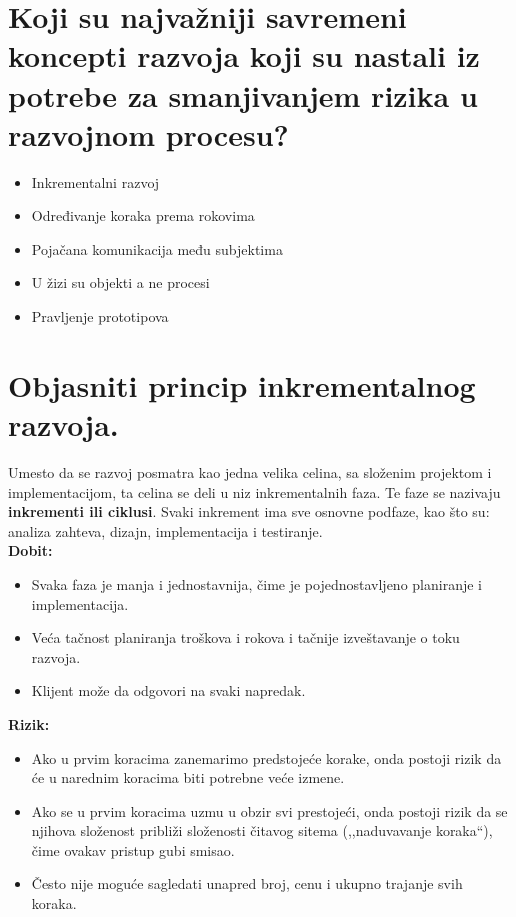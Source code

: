 \documentclass[a4paper]{article}
\begin{document}
\section{Koji su najvažniji savremeni koncepti razvoja koji su nastali iz potrebe 
         za smanjivanjem rizika u razvojnom procesu?}
  \begin{itemize}
    \item Inkrementalni razvoj
    \item Određivanje koraka prema rokovima
    \item Pojačana komunikacija među subjektima
    \item U žizi su objekti a ne procesi
    \item Pravljenje prototipova
  \end{itemize}

\section{Objasniti princip inkrementalnog razvoja.}
  Umesto da se razvoj posmatra kao jedna velika celina, sa složenim projektom i implementacijom,
  ta celina se deli u niz inkrementalnih faza. Te faze se nazivaju \textbf{inkrementi ili ciklusi}. 
  Svaki inkrement ima sve osnovne podfaze, kao što su: analiza zahteva, dizajn, 
  implementacija i testiranje. \cite{guru99_incremental_model}\\
  \textbf{Dobit:}
  \begin{itemize}
    \item Svaka faza je manja i jednostavnija, čime je pojednostavljeno planiranje i implementacija.
    \item Veća tačnost planiranja troškova i rokova i tačnije izveštavanje o toku razvoja.
    \item Klijent može da odgovori na svaki napredak.
  \end{itemize}
  \textbf{Rizik:}
  \begin{itemize}
    \item Ako u prvim koracima zanemarimo predstojeće korake, onda postoji rizik da će
          u narednim koracima biti potrebne veće izmene.
    \item Ako se u prvim koracima uzmu u obzir svi prestojeći, onda postoji rizik da se 
          njihova složenost približi složenosti čitavog sitema (,,naduvavanje koraka``), 
          čime ovakav pristup gubi smisao.
    \item Često nije moguće sagledati unapred broj, cenu i ukupno trajanje svih koraka.
  \end{itemize}
\end{document}
